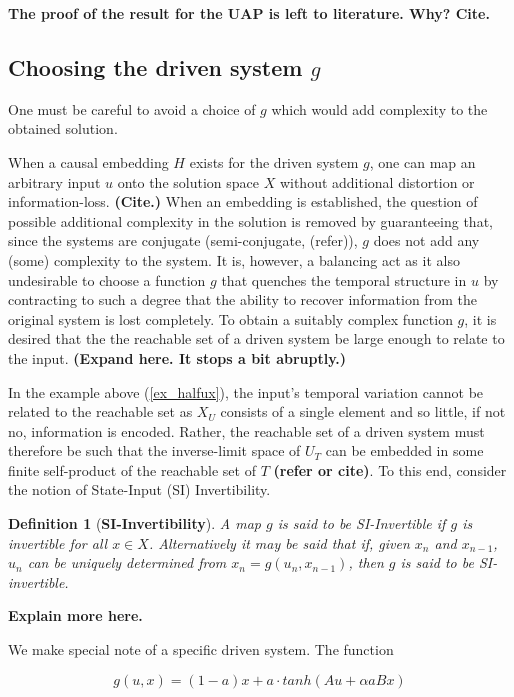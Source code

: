 \documentclass[12 pt]{article}
\newtheorem{Definition}{Definition}[]
\begin{document}
\textbf{The proof of the result for the UAP is left to literature. Why? Cite.}

\subsection {Choosing the driven system $g$}

One must be careful to avoid a choice of $g$ which would  add complexity to the obtained solution.  

When a causal embedding $H$ exists for the driven system $g$, one can map an arbitrary input ${u}$ onto the solution space $X$ without additional distortion or information-loss.  \textbf{(Cite.)} 
When an embedding is established, the question of possible additional complexity in the solution is removed by guaranteeing that, since the systems are conjugate (semi-conjugate, (refer)), $g$ does not add any (some) complexity to the system.  
It is, however, a balancing act as it also undesirable to choose a function $g$ that quenches the temporal structure in $u$ by contracting to such a degree that the ability to recover information from the original system is lost completely. 
To obtain a suitably complex function $g$, it is desired that the the reachable set of a driven system  be large enough to relate to the input.  \textbf{(Expand here. It stops a bit abruptly.)}
 
In the example above (\ref{ex_halfux}), the input's temporal variation cannot be related to the reachable set as $X_U$ consists of a single element and so little, if not no, information is encoded.  Rather, the reachable set of a driven system must therefore be such that the inverse-limit space of $U_T$ can be embedded in some finite self-product of the reachable set of $T$ \textbf{(refer or cite)}. To this end, consider the notion of State-Input (SI) Invertibility.  

\begin{Definition}
  [\bf SI-Invertibility]\label{Dfn_SIinv}
  A map $g$ is said to be SI-Invertible if $g$ is invertible for all $x\in{X}$. Alternatively it may be said that if, given $x_n$ and $x_{n-1}$, $u_n$ can be uniquely determined from $x_n=g(u_n,x_{n-1})$, then $g$ is said to be SI-invertible.
\end{Definition}
 
\textbf{Explain more here.}

We make special note of a specific driven system. The function 

\begin{equation}  \label{eqn_driveng}
g(u,x)=(1-a)x+a{\cdot}tanh(Au+\alpha{a}Bx)
\end{equation} 
\end{document}
